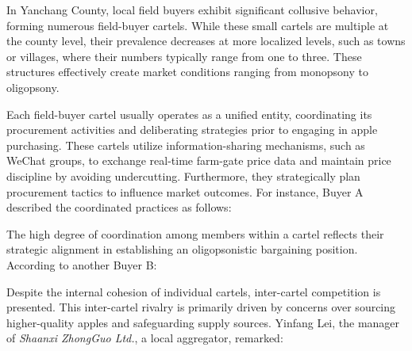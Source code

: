 In Yanchang County, local field buyers exhibit significant collusive behavior, forming numerous field-buyer cartels. While these small cartels are multiple at the county level, their prevalence decreases at more localized levels, such as towns or villages, where their numbers typically range from one to three. These structures effectively create market conditions ranging from monopsony to oligopsony.

Each field-buyer cartel usually operates as a unified entity, coordinating its procurement activities and deliberating strategies prior to engaging in apple purchasing. These cartels utilize information-sharing mechanisms, such as WeChat groups, to exchange real-time farm-gate price data and maintain price discipline by avoiding undercutting. Furthermore, they strategically plan procurement tactics to influence market outcomes. For instance, Buyer A described the coordinated practices as follows:

\begin{quote}
\end{quote}

The high degree of coordination among members within a cartel reflects their strategic alignment in establishing an oligopsonistic bargaining position. According to another Buyer B:

\begin{quote}
\end{quote}

Despite the internal cohesion of individual cartels, inter-cartel competition is presented. This inter-cartel rivalry is primarily driven by concerns over sourcing higher-quality apples and safeguarding supply sources. Yinfang Lei, the manager of \textit{Shaanxi ZhongGuo Ltd.}, a local aggregator, remarked:

\begin{quote}
\end{quote}

